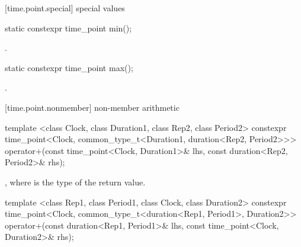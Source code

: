[time.point.special]{ special values}

%
%
\begin{itemdecl}
static constexpr time_point min();
\end{itemdecl}

\begin{itemdescr}
\pnum
\returns {}.
\end{itemdescr}

%
%
\begin{itemdecl}
static constexpr time_point max();
\end{itemdecl}

\begin{itemdescr}
\pnum
\returns {}.
\end{itemdescr}

[time.point.nonmember]{ non-member arithmetic}

%
%
%
%
\begin{itemdecl}
template <class Clock, class Duration1, class Rep2, class Period2>
  constexpr time_point<Clock, common_type_t<Duration1, duration<Rep2, Period2>>>
  operator+(const time_point<Clock, Duration1>& lhs, const duration<Rep2, Period2>& rhs);
\end{itemdecl}

\begin{itemdescr}
\pnum
\returns {}, where  is the type of the return value.
\end{itemdescr}

%
%
%
%
\begin{itemdecl}
template <class Rep1, class Period1, class Clock, class Duration2>
  constexpr time_point<Clock, common_type_t<duration<Rep1, Period1>, Duration2>>
  operator+(const duration<Rep1, Period1>& lhs, const time_point<Clock, Duration2>& rhs);
\end{itemdecl}

